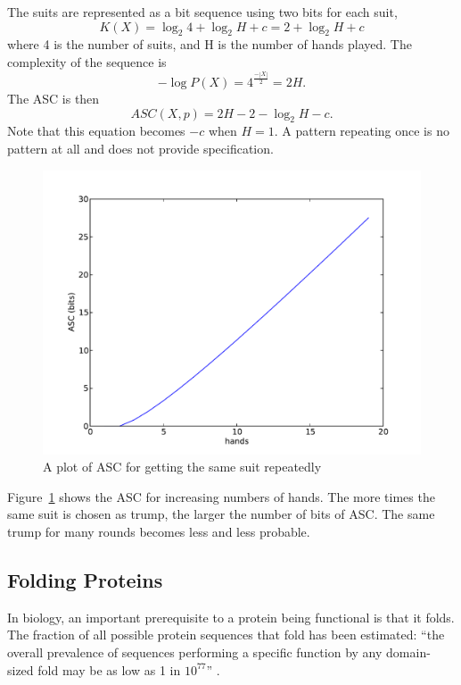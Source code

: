 The suits are represented as a bit sequence using two bits for each suit,
\begin{equation}
    K(X) = \log_2 4 + \log_2 H + c = 2 + \log_2 H + c
\end{equation} where 4 is the number of suits, and H is the number of hands played.
The complexity of the sequence is 
\begin{equation}
    -\log P(X) = 4^\frac{-|X|}{2} = 2H \mbox{.}
\end{equation}
The ASC is then
\begin{equation}
    ASC(X,p) = 2H - 2 - \log_2 H - c \mbox{.}
\end{equation}
Note that this equation becomes $-c$ when $H=1$.
A pattern repeating once is no pattern at all and does not provide specification.
\begin{figure}[H]
    \includegraphics[width=\textwidth]{EwertRepeat}
    \caption{A plot of ASC for getting the same suit repeatedly}
    \label{suit.plot}
\end{figure}
Figure~\ref{suit.plot} shows the ASC for increasing numbers of hands.
The more times the same suit is chosen as trump, the larger the number of bits of ASC.
The same trump for many rounds becomes less and less probable.

\subsection{Folding Proteins}
\label{sec_folding}

In biology, an important prerequisite to a protein being functional is that it folds.
The fraction of all possible protein sequences that fold has been estimated: ``the overall prevalence of sequences performing a specific function by any domain-sized fold may be as low as 1 in $10^{77}$'' \citep{axe2004}.

